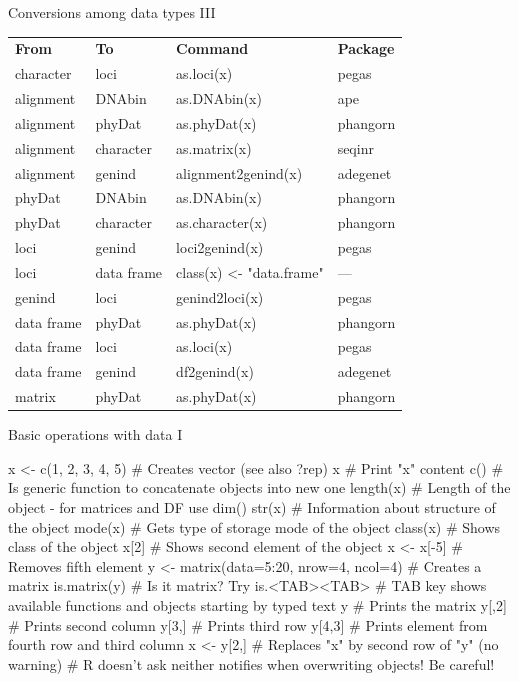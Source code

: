 \documentclass[compress, ucs, xelatex, 11pt, xcolor=svgnames,
  hyperref={
    bookmarks=true,
    unicode=true,
    colorlinks=true,
    pdftitle={Molecular data in R},
    plainpages=false,
    pdfauthor={Vojtech Zeisek},
    pdfsubject={Course about phylogeny and evolution in R},
    pdfcreator={XeLaTeX},
    pdfkeywords={R, evolution, phylogeny, molecular data},
    linkcolor=Tomato,
    anchorcolor=SaddleBrown,
    citecolor=Goldenrod,
    filecolor=DarkMagenta,
    menucolor=Sienna,
    urlcolor=DarkTurquoise,
    pdftex},
  url={hyphens, lowtilde} %
  ]{beamer}
\begin{document}
\begin{frame}{Conversions among data types III}
  \begin{tabular}{llll}
    \textbf{From} & \textbf{To} & \textbf{Command} & \textbf{Package}\\
    character & loci & as.loci(x) & pegas\\
    alignment & DNAbin & as.DNAbin(x) & ape\\
    alignment & phyDat & as.phyDat(x) & phangorn\\
    alignment & character & as.matrix(x) & seqinr\\
    alignment & genind & alignment2genind(x) & adegenet\\
    phyDat & DNAbin & as.DNAbin(x) & phangorn\\
    phyDat & character & as.character(x) & phangorn\\
    loci & genind & loci2genind(x) & pegas\\
    loci & data frame & class(x) <- "data.frame" & --- \\
    genind & loci & genind2loci(x) & pegas\\
    data frame & phyDat & as.phyDat(x) & phangorn\\
    data frame & loci & as.loci(x) & pegas\\
    data frame & genind & df2genind(x) & adegenet\\
    matrix & phyDat & as.phyDat(x) & phangorn
  \end{tabular}
\end{frame}

\begin{frame}[fragile]{Basic operations with data I}
  \begin{spluscode}
    x <- c(1, 2, 3, 4, 5) # Creates vector (see also ?rep)
    x # Print "x" content
    c() # Is generic function to concatenate objects into new one
    length(x) # Length of the object - for matrices and DF use dim()
    str(x) # Information about structure of the object
    mode(x) # Gets type of storage mode of the object
    class(x) # Shows class of the object
    x[2] # Shows second element of the object
    x <- x[-5] # Removes fifth element
    y <- matrix(data=5:20, nrow=4, ncol=4) # Creates a matrix
    is.matrix(y) # Is it matrix? Try is.<TAB><TAB>
    # TAB key shows available functions and objects starting by typed text
    y # Prints the matrix
    y[,2] # Prints second column
    y[3,] # Prints third row
    y[4,3] # Prints element from fourth row and third column
    x <- y[2,] # Replaces "x" by second row of "y" (no warning)
    # R doesn't ask neither notifies when overwriting objects! Be careful!
  \end{spluscode}
\end{frame}
\end{document}
